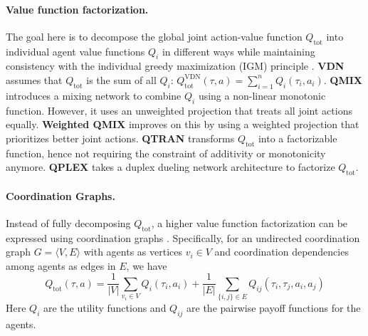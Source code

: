 \paragraph{Value function factorization.} The goal here is to decompose the global joint action-value function \( Q_{\text{tot}} \) into individual agent value functions \( Q_i \) in different ways while maintaining consistency with the individual greedy maximization (IGM) principle \cite{son2019qtran}. \textbf{VDN} \cite{sunehag2018value} assumes that \( Q_{\text{tot}} \) is the sum of all \( Q_i \): $Q^{\text{VDN}}_{\text{tot}}(\tau, a) = \sum_{i=1}^{n} Q_i(\tau_i, a_i) $. \textbf{QMIX} \cite{rashid2018qmix} introduces a mixing network to combine \( Q_i \) using a non-linear monotonic function. However, it uses an unweighted projection that treats all joint actions equally. \textbf{Weighted QMIX} \cite{rashid2020weighted} improves on this by using a weighted projection that prioritizes better joint actions. \textbf{QTRAN} \cite{son2019qtran} transforms \( Q_{\text{tot}} \) into a factorizable function, hence not requiring the constraint of additivity or monotonicity anymore. \textbf{QPLEX} \cite{wang2021qplex} takes a duplex dueling network architecture to factorize \( Q_{\text{tot}} \). 

\paragraph{Coordination Graphs.} Instead of fully decomposing \( Q_{\text{tot}} \), a higher value function factorization can be expressed using coordination graphs \cite{guestrin2002coordinated}. Specifically, for an undirected coordination graph $G = \langle V, E \rangle$ with agents as vertices $v_i \in V$ and coordination dependencies among agents as edges in $E$, we have \[ Q_{\text{tot}}(\tau, a) = \frac{1}{|V|} \sum_{v_i \in V} Q_i(\tau_i, a_i) + \frac{1}{|E|} \sum_{\{i,j\} \in E} Q_{ij}(\tau_i, \tau_j, a_i, a_j)\] Here $Q_i$ are the utility functions and $Q_{ij}$ are the pairwise payoff functions for the agents. 



